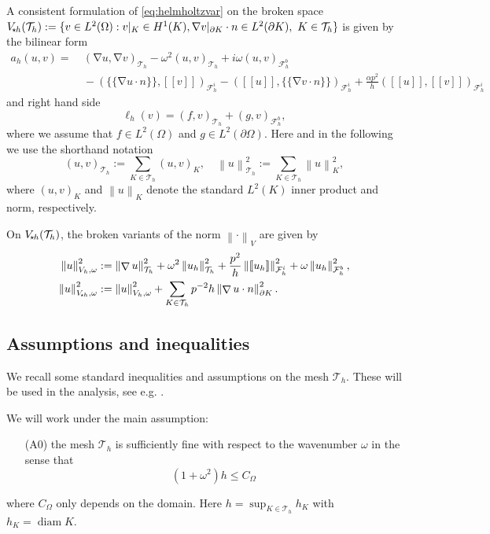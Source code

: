 \documentclass[11pt]{article}
\newenvironment{eqs} %
 { \begin{equation} \begin{aligned} } %
 { \end{aligned} \end{equation} \ignorespacesafterend } %
\theoremstyle{definition}
\theoremstyle{plain}
\newcommand{\Vsh}{V_{\!\star \hspace*{-0.2mm}h}}
\newcommand{\dgonorm}[1]{\norm{#1}_{V_h,\omega}}
\newcommand{\tdgonorm}[1]{{\Vert#1\Vert}_{\Vsh,\omega}}
\newcommand{\jmp}[1]{[\![ #1 ]\!]}
\newcommand{\avg}[1]{\{\!\!\{#1\}\!\!\}}
\newcommand{\Th}{{\calT_h}}
\newcommand{\Fhi}{{\calF_h^i}}
\newcommand{\Fhb}{{\calF_h^b}}
\DeclareMathOperator{\grad}{\nabla}
\DeclareMathOperator{\diam}{diam}
\newcommand{\inner}[1]{( #1 )}
\newcommand*{\norm}[1]{\left\|#1\right\|}
\newcommand{\calF}{\mathcal{F}}
\newcommand{\calT}{\mathcal{T}}
\begin{document}
A consistent formulation of \eqref{eq:helmholtzvar} on the broken space $\Vsh(\Th) := \{v\in L^2(\Omega) : v|_K \in H^1(K), \nabla v|_{\partial K}\cdot n \in L^2(\partial K),\ K\in\Th\}$ is given by  the bilinear form 
\begin{eqs}
    a_h(u,v) =&\ \inner{\grad u, \grad v}_\Th - \omega^2 \inner{u, v}_\Th + i\omega\inner{u,v}_\Fhb\\
              &\ - \inner{\avg{\grad u \cdot n},\jmp{v}}_\Fhi - \inner{\jmp{u},\avg{\grad v \cdot n}}_\Fhi + \frac{\alpha p^2}{h}\inner{\jmp{u},\jmp{v}}_\Fhi
\end{eqs}
and right hand side 
\begin{equation}
    \ell_h(v) = \inner{f, v}_\Th + \inner{g, v}_{\Fhb},
\end{equation}
where we assume that $f\in L^2(\Omega)$ and $g\in L^2(\partial\Omega)$.
Here and in the following we use the shorthand notation
\[
    \inner{u,v}_\Th := \sum_{K\in\Th} \inner{u,v}_K, \quad \norm{u}^2_\Th := \sum_{K\in\Th} \norm{u}^2_K,
\]
where $\inner{u,v}_K$ and $\norm{u}_K$ denote the standard $L^2(K)$ inner product and norm, respectively.



On $\Vsh(\Th)$, the broken variants of the norm $\norm{\cdot}_V$ are given by
\begin{align*}
    \dgonorm{u}^2 & :=  \norm{\grad u}^2_\Th + \omega^2\norm{u_h}^2_\Th +\frac{p^2}{h}\norm{\jmp{u_h}}^2_\Fhi+\omega\norm{u_h}^2_\Fhb , \\  
    \tdgonorm{u}^2 &  := \dgonorm{u}^2 + \sum_{K\in\Th}p^{-2}h\norm{\grad u \cdot n}^2_{\partial K}.
\end{align*}



\subsection{Assumptions and inequalities}
We recall some standard inequalities and assumptions on the mesh $\Th$.
These will be used in the analysis, see e.g. \cite{CDG22,CDGH17}. %

We will work under the main assumption: 
\begin{itemize}
  \item[(A0)] the mesh $\Th$ is sufficiently fine with respect to the wavenumber $\omega$ in the sense that
\begin{equation}\label{ass:oh}
    (1+\omega^2)h \leq C_\Omega
\end{equation}
\end{itemize}
where $C_\Omega$ only depends on the domain.
Here $h = \sup_{K\in\Th} h_K$ with $h_K = \diam K$.
\end{document}
